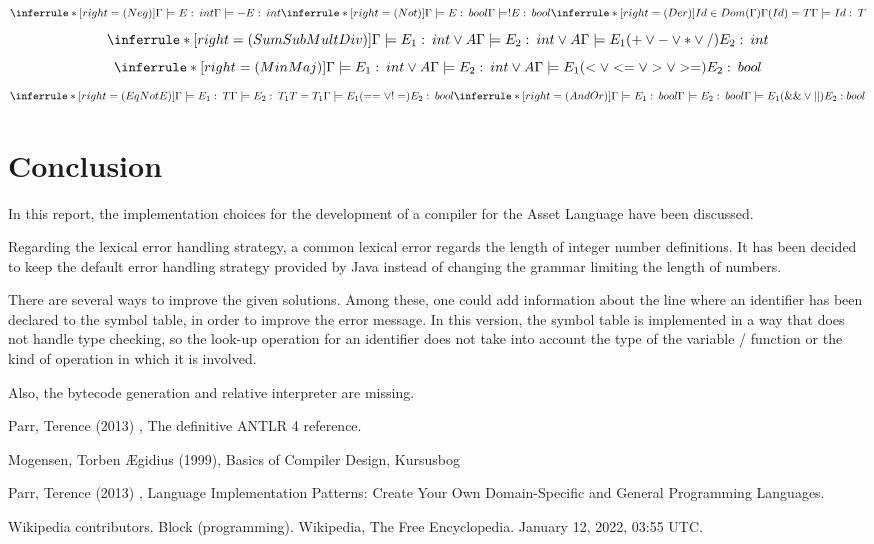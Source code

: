 \documentclass[11pt]{article} %
\begin{document}
\[
\inferrule*[right=(Neg)]
{\Gamma \models E : \: int}
{\Gamma \models - E : \: int}
\inferrule*[right=(Not)]
{\Gamma \models E : \: bool}
{\Gamma \models ! E : \: bool}
\inferrule*[right=(Der)]
{Id \in Dom(\Gamma) \\ \Gamma(Id)=T}
{\Gamma \models Id : \: T}
\]
\[
\inferrule*[right=(SumSubMultDiv)]
{\Gamma \models E_1 : \: int \lor A \\ \Gamma \models E_2 : \: int \lor A}
{\Gamma \models E_1 (+\lor-\lor*\lor/) E_2 : \: int}
\]
\[
\inferrule*[right=(MinMaj)]
{\Gamma \models E_1 : \: int \lor A \\ \Gamma \models E_2 : \: int \lor A}
{\Gamma \models E_1 (<\lor<=\lor>\lor>=) E_2 : \: bool}
\]
\[
\inferrule*[right=(EqNotE)]
{\Gamma \models E_1 : \: T \\ \Gamma \models E_2 : \: T_1 \\ T=T_1}
{\Gamma \models E_1 (==\lor!=) E_2 : \: bool}
\inferrule*[right=(AndOr)]
{\Gamma \models E_1 : \: bool \\ \Gamma \models E_2 : \: bool}
{\Gamma \models E_1 (\&\&\lor||) E_2 : bool}
\]

\section{Conclusion}
In this report, the implementation choices for the development of a compiler for the Asset Language have been discussed.

\medskip

Regarding the lexical error handling strategy, a common lexical error regards the length of integer number definitions. It has been decided to keep the default error handling strategy provided by Java instead of changing the grammar limiting the length of numbers.

\medskip

There are several ways to improve the given solutions. Among these, one could add information about the line where an identifier has been declared to the symbol table, in order to improve the error message. In this version, the symbol table is implemented in a way that does not handle type checking, so the look-up operation for an identifier does not take into account the type of the variable / function or the kind of operation in which it is involved.

\medskip

Also, the bytecode generation and relative interpreter are missing.

\clearpage

\begin{thebibliography}{9}
Parr, Terence (2013) , The definitive ANTLR 4 reference.

Mogensen, {Torben {\AE}gidius} (1999), Basics of Compiler Design, Kursusbog 

Parr, Terence (2013) , Language Implementation Patterns: Create Your Own Domain-Specific and General Programming Languages.

Wikipedia contributors. Block (programming). Wikipedia, The Free Encyclopedia. January 12, 2022, 03:55 UTC. 
\end{thebibliography}
\end{document}
